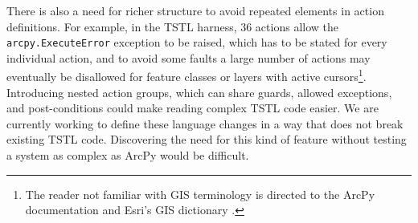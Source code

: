 There is also a need for richer structure to avoid repeated
elements in action definitions.  For example, in the TSTL harness, 36
actions allow the {\tt arcpy.ExecuteError} exception to be raised,
which has to be stated for every individual action, and to avoid some
faults a large number of actions may eventually be disallowed for
feature classes or layers with active cursors\footnote{The reader
  not familiar with GIS terminology is directed to the ArcPy
  documentation \cite{ArcPy} and Esri's GIS dictionary \cite{GISDict}.}.  Introducing nested
action groups, which can share guards, allowed exceptions, and
post-conditions could make reading complex TSTL code easier.  We are
currently working to define these language changes in a way that does
not break existing TSTL code.  Discovering the need for this kind of
feature without testing a system as complex as ArcPy would be
difficult.
